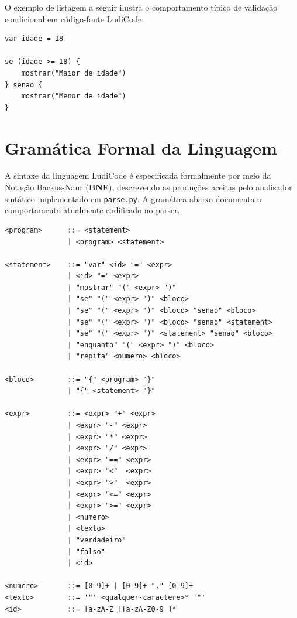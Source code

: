 \documentclass[12pt,a4paper]{article}
\begin{document}
O exemplo de listagem a seguir ilustra o comportamento típico de validação condicional em código-fonte LudiCode:

\begin{lstlisting}[caption={Exemplo de estrutura de controle condicional}]
var idade = 18

se (idade >= 18) {
    mostrar("Maior de idade")
} senao {
    mostrar("Menor de idade")
}
\end{lstlisting}


\section{Gramática Formal da Linguagem}

A sintaxe da linguagem LudiCode é especificada formalmente por meio da Notação Backus-Naur (\textbf{BNF}), descrevendo as produções aceitas pelo analisador sintático implementado em \texttt{parse.py}. A gramática abaixo documenta o comportamento atualmente codificado no parser.

\begin{lstlisting}[language={}, caption={Especificação BNF da Linguagem LudiCode conforme parse.py}, keywordstyle=\color{black}, numbers=none, frame=single]
<program>      ::= <statement>
               | <program> <statement>

<statement>    ::= "var" <id> "=" <expr>
               | <id> "=" <expr>
               | "mostrar" "(" <expr> ")"
               | "se" "(" <expr> ")" <bloco>
               | "se" "(" <expr> ")" <bloco> "senao" <bloco>
               | "se" "(" <expr> ")" <bloco> "senao" <statement>
               | "se" "(" <expr> ")" <statement> "senao" <bloco>
               | "enquanto" "(" <expr> ")" <bloco>
               | "repita" <numero> <bloco>

<bloco>        ::= "{" <program> "}"
               | "{" <statement> "}"

<expr>         ::= <expr> "+" <expr>
               | <expr> "-" <expr>
               | <expr> "*" <expr>
               | <expr> "/" <expr>
               | <expr> "==" <expr>
               | <expr> "<"  <expr>
               | <expr> ">"  <expr>
               | <expr> "<=" <expr>
               | <expr> ">=" <expr>
               | <numero>
               | <texto>
               | "verdadeiro"
               | "falso"
               | <id>

<numero>       ::= [0-9]+ | [0-9]+ "." [0-9]+
<texto>        ::= '"' <qualquer-caractere>* '"'
<id>           ::= [a-zA-Z_][a-zA-Z0-9_]*
\end{lstlisting}
\end{document}
